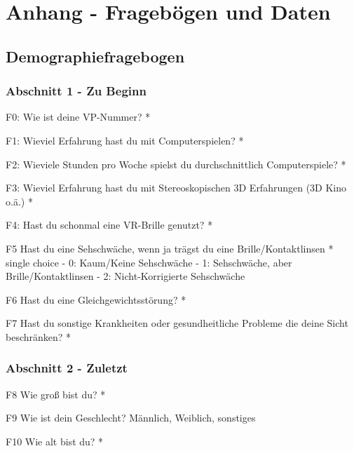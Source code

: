 \chapter*{Anhang - Fragebögen und Daten}
\label{anhang}

\section*{Demographiefragebogen}
\label{anhang:demo}

\subsection*{Abschnitt 1 - Zu Beginn}

F0: Wie ist deine VP-Nummer? *

F1: Wieviel Erfahrung hast du mit Computerspielen? *

F2: Wieviele Stunden pro Woche spielst du durchschnittlich Computerspiele? *

F3: Wieviel Erfahrung hast du mit Stereoskopischen 3D Erfahrungen (3D Kino o.ä.) *

F4: Hast du schonmal eine VR-Brille genutzt? *

F5 Hast du eine Sehschwäche, wenn ja trägst du eine Brille/Kontaktlinsen *
single choice
- 0: Kaum/Keine Sehschwäche
- 1: Sehschwäche, aber Brille/Kontaktlinsen
- 2: Nicht-Korrigierte Sehschwäche

F6 Hast du eine Gleichgewichtsstörung? *

F7 Hast du sonstige Krankheiten oder gesundheitliche Probleme die deine Sicht beschränken? *

\subsection*{Abschnitt 2 - Zuletzt}

F8 Wie groß bist du? *

F9 Wie ist dein Geschlecht?
Männlich, Weiblich, sonstiges

F10 Wie alt bist du? *

